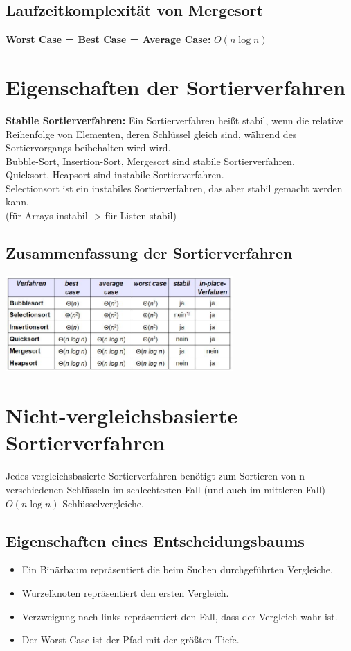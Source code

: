 \documentclass{scrreprt}
\begin{document}
\subsection{Laufzeitkomplexität von Mergesort}
\textbf{Worst Case = Best Case = Average Case:} $O(n \log n)$
\section{Eigenschaften der Sortierverfahren}
\textbf{Stabile Sortierverfahren:} Ein Sortierverfahren heißt stabil, wenn die relative Reihenfolge von Elementen,
deren Schlüssel gleich sind, während des Sortiervorgangs beibehalten wird wird.
\\Bubble-Sort, Insertion-Sort, Mergesort sind stabile Sortierverfahren.
\\Quicksort, Heapsort sind instabile Sortierverfahren.
\\Selectionsort ist ein instabiles Sortierverfahren, das aber stabil gemacht werden kann.
\\(für Arrays instabil -> für Listen stabil)
\subsection{Zusammenfassung der Sortierverfahren}
\includegraphics[width=0.65\textwidth]{graphics/sortierverfahren-table}
\section{Nicht-vergleichsbasierte Sortierverfahren}
Jedes vergleichsbasierte Sortierverfahren benötigt zum Sortieren von n
verschiedenen Schlüsseln im schlechtesten Fall (und auch im mittleren Fall)
$O(n \log n)$ Schlüsselvergleiche.
\subsection{Eigenschaften eines Entscheidungsbaums}
\begin{itemize}
  \item Ein Binärbaum repräsentiert die beim Suchen durchgeführten Vergleiche.
  \item Wurzelknoten repräsentiert den ersten Vergleich.
  \item Verzweigung nach links repräsentiert den Fall, dass der Vergleich wahr ist.
  \item Der Worst-Case ist der Pfad mit der größten Tiefe.
\end{itemize}
\end{document}
